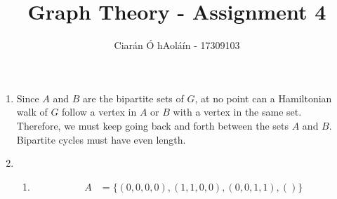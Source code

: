 \documentclass{article}
\title{Graph Theory - Assignment 4}
\author{Ciarán Ó hAoláín - 17309103}
\theoremstyle{definition}
\theoremstyle{remark}
\theoremstyle{example}
\begin{document}
	\maketitle
	
	\begin{enumerate}
		\item Since $A$ and $B$ are the bipartite sets of $G$, at no point can a Hamiltonian walk of $G$ follow a vertex in $A$ or $B$ with a vertex in the same set.\\
		Therefore, we must keep going back and forth between the sets $A$ and $B$.\\
		Bipartite cycles must have even length.
		\item \begin{enumerate}
			\item \begin{align*}
				A&=\{(0,0,0,0),(1,1,0,0),(0,0,1,1),()\}
			\end{align*}
		\end{enumerate}
	\end{enumerate}
	
\end{document}

